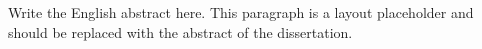 Write the English abstract here. This paragraph is a layout placeholder and should be replaced with the abstract of the dissertation.
